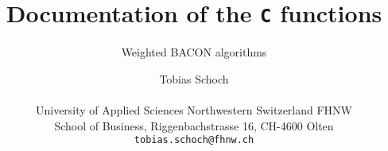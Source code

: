 \documentclass[a4paper,oneside,10pt,DIV=12]{scrreprt}
\begin{document}
\def\VERBOSE{
	\item[\code{verbose}] toggle, \code{[int]}, \code{1}: verbose (i.e., the
	function prints detailed information to the console), \code{0}: quiet.}
\def\SUBSET#1{
	\item[\code{subset#1}] subset, \code{int array[n]}; with elements in the
		set $\{0, 1\}$, where $1$ signifies that the element is in the subset.}
\def\DATA#1#2#3{
	\item[\code{#1}] #2, \code{double array[#3]}.}
\def\WEIGHTS#1{
	\item[\code{#1}] sampling weights, \code{double array[n]}.
}
\def\CENTER{
	\item[\code{center}] center, \code{double array[p]}.
}
\def\SCATTER{
	\item[\code{scatter}] scatter matrix, \code{double array[p, p]}.
}
\def\DIST{
	\item[\code{dist}] distances, \code{double array[n]}.
}
\def\WORKwb{
	\item[\code{work}] work array, typedef struct
		\code{\LinkA{workarray}{workarray}}.
}
\def\WORKreg{
	\item[\code{work}] work array, typedef struct
		\code{\LinkA{workarray}{workarray2}}.
}
\def\WORKARRAY#1#2#3{
	\item[\code{work#1}] #2, \code{double array[#3]}.
}
\def\WBDATA{
	\item[\code{dat}] data, typedef struct \code{\LinkA{wbdata}{wbdata}}.
}
\def\REGDATA{
	\item[\code{dat}] regression data, typedef struct
		\code{\LinkA{regdata}{regdata}}.
}
\def\EST{
	\item[\code{est}] estimates, typedef struct
		\code{\LinkA{estimate}{estimate}}.
}			
\def\SUBSETSIZEm{
	\item[\code{m}] size of the subset, \code{[int]}.
}
\def\COLLECT{
	\item[\code{collect}] size of the initial basic subset, \code{[int]}.
}
\def\MAXITER#1{
	\item[\code{maxiter}] maximum number of iterations, \code{[int]#1} 
}
\def\IARRAY#1#2{
	\item[\code{iarray}] #1, \code{int array[#2].} 
}

 
\title{\Large Documentation of the \texttt{C} functions}
\subtitle{Weighted BACON algorithms} 

\author{{\normalsize Tobias Schoch} \\ 
\begin{minipage}[t][][t]{\textwidth}
	\begin{center}
	\small{University of Applied Sciences Northwestern Switzerland FHNW} \\
	\small{School of Business, Riggenbachstrasse 16, CH-4600 Olten} \\
	\small{\texttt{tobias.schoch{@}fhnw.ch}}
	\end{center}
\end{minipage}} 
\end{document}
